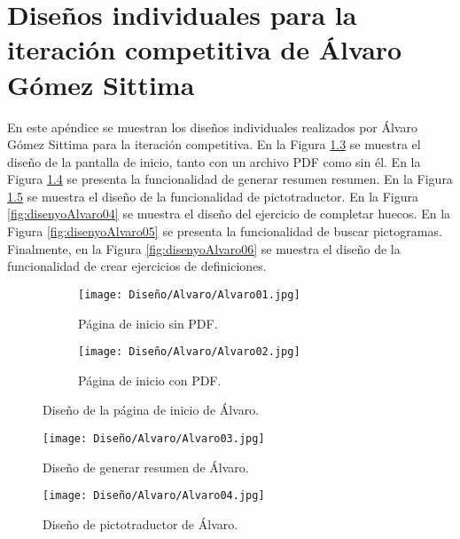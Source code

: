 \chapter{Diseños individuales para la iteración competitiva de Álvaro Gómez Sittima}
\label{ape:disenyoAlvaro}
En este apéndice se muestran los diseños individuales realizados por Álvaro Gómez Sittima para la iteración competitiva. En la Figura \ref{fig:disenyoAlvaro01} se muestra el diseño de la pantalla de inicio, tanto con un archivo PDF como sin él. En la Figura \ref{fig:disenyoAlvaro02} se presenta la funcionalidad de generar resumen resumen. En la Figura \ref{fig:disenyoAlvaro03} se muestra el diseño de la funcionalidad de pictotraductor. En la Figura \ref{fig:disenyoAlvaro04} se muestra el diseño del ejercicio de completar huecos. En la Figura \ref{fig:disenyoAlvaro05} se presenta la funcionalidad de buscar pictogramas. Finalmente, en la Figura \ref{fig:disenyoAlvaro06} se muestra el diseño de la funcionalidad de crear ejercicios de definiciones.

\begin{figure}[ht!]
  \centering

  \begin{subfigure}{\textwidth}
    \centering
    \texttt{[image: Diseño/Alvaro/Alvaro01.jpg]}
    \caption{Página de inicio sin PDF.}
    \label{fig:disenyoAlvaro01a}
  \end{subfigure}

  \begin{subfigure}{\textwidth}
    \centering
    \texttt{[image: Diseño/Alvaro/Alvaro02.jpg]}
    \caption{Página de inicio con PDF.}
    \label{fig:disenyoAlvaro01b}
  \end{subfigure}

  \caption{Diseño de la página de inicio de Álvaro.}
  \label{fig:disenyoAlvaro01}
\end{figure}

\begin{figure}[ht!]
  \centering
  \texttt{[image: Diseño/Alvaro/Alvaro03.jpg]}
  \caption{Diseño de generar resumen de Álvaro.}
  \label{fig:disenyoAlvaro02}
\end{figure}

\begin{figure}[ht!]
  \centering
  \texttt{[image: Diseño/Alvaro/Alvaro04.jpg]}
  \caption{Diseño de pictotraductor de Álvaro.}
  \label{fig:disenyoAlvaro03}
\end{figure}

